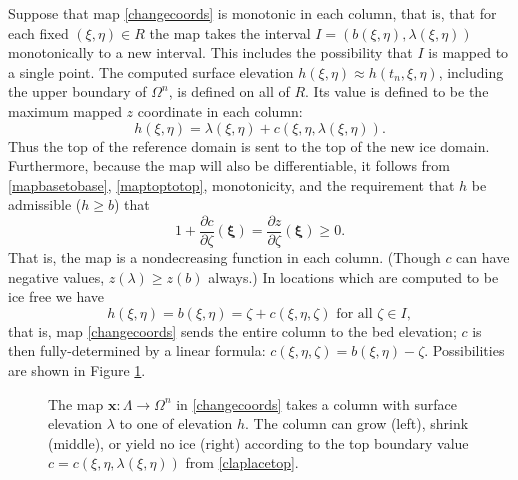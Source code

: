 \documentclass[letterpaper,final,12pt,reqno]{amsart}
\newcommand{\bx}{\mathbf{x}}
\newcommand{\bxi}{\bm{\xi}}
\begin{document}
Suppose that map \eqref{changecoords} is monotonic in each column, that is, that for each fixed $(\xi,\eta)\in R$ the map takes the interval $I=(b(\xi,\eta),\lambda(\xi,\eta))$ monotonically to a new interval.  This includes the possibility that $I$ is mapped to a single point.  The computed surface elevation $h(\xi,\eta)\approx h(t_n,\xi,\eta)$, including the upper boundary of $\Omega^n$, is defined on all of $R$.  Its value is defined to be the maximum mapped $z$ coordinate in each column:
\begin{equation}
h(\xi,\eta) = \lambda(\xi,\eta) + c(\xi,\eta,\lambda(\xi,\eta)). \label{maptoptotop}
\end{equation}
Thus the top of the reference domain is sent to the top of the new ice domain.  Furthermore, because the map will also be differentiable, it follows from \eqref{mapbasetobase}, \eqref{maptoptotop}, monotonicity, and the requirement that $h$ be admissible ($h\ge b$) that
\begin{equation}
1 + \frac{\partial c}{\partial \zeta}(\bxi) = \frac{\partial z}{\partial \zeta}(\bxi) \ge 0. \label{mapmonotonic}
\end{equation}
That is, the map is a nondecreasing function in each column.  (Though $c$ can have negative values, $z(\lambda) \ge z(b)$ always.)  In locations which are computed to be ice free we have
\begin{equation}
h(\xi,\eta)=b(\xi,\eta) = \zeta + c(\xi,\eta,\zeta) \text{ for all } \zeta \in I, \label{mapcrushes}
\end{equation}
that is, map \eqref{changecoords} sends the entire column to the bed elevation; $c$ is then fully-determined by a linear formula: $c(\xi,\eta,\zeta) = b(\xi,\eta) - \zeta$.  Possibilities are shown in Figure \ref{fig:mapI}.

\begin{figure}[ht]

\caption{The map $\bx:\Lambda \to \Omega^n$ in \eqref{changecoords} takes a column with surface elevation $\lambda$ to one of elevation $h$.  The column can grow (left), shrink (middle), or yield no ice (right) according to the top boundary value $c=c(\xi,\eta,\lambda(\xi,\eta))$ from \eqref{claplacetop}.}
\label{fig:mapI}
\end{figure}
\end{document}
